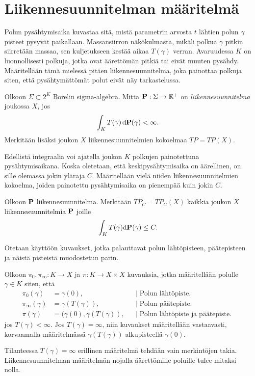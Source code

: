 \documentclass[12pt,oneside,a4paper]{amsbook} %
\begin{document}
\section{Liikennesuunnitelman määritelmä}

Polun pysähtymisaika kuvastaa sitä, mistä parametrin arvosta $t$ lähtien polun $\gamma$ pisteet pysyvät paikallaan. Massansiirron näkökulmasta, mikäli polkua $\gamma$ pitkin siirretään massaa, sen kuljetukseen kestää aikaa $T(\gamma)$ verran. Avaruudessa $K$ on luonnollisesti polkuja, jotka ovat äärettömän pitkiä tai eivät muuten pysähdy. Määritellään tämä mielessä pitäen liikennesuunnitelma, joka painottaa polkuja siten, että pysähtymättömät polut eivät näy tarkastelussa.

\begin{definition}\label{def:liikennesuunnitelma}
    Olkoon $\Sigma \subset 2^K$ Borelin sigma-algebra. Mitta $\P: \Sigma \to \R^+$ on \textit{liikennesuunnitelma} joukossa $X$, jos
    \begin{equation*}
     \int_K T(\gamma) \, \d \P (\gamma) < \infty.   
    \end{equation*}
    Merkitään lisäksi joukon $X$ liikennesuunnitelmien kokoelmaa $TP = TP(X)$.
\end{definition}

Edellistä integraalia voi ajatella joukon $K$ polkujen painotettuna pysähtymisaikana. Koska oletetaan, että keskipysähtymisaika on äärellinen, on sille olemassa jokin yläraja $C$. Määritellään vielä niiden liikennesuunnitelmien kokoelma, joiden painotettu pysähtymisaika on pienempää kuin jokin $C$.

\begin{definition}
    Olkoon $\P$ liikennesuunnitelma. Merkitään $TP_C = TP_C(X)$ kaikkia joukon $X$ liikennesuunnitelmia $\P$ joille
    \begin{equation*}
        \int_K T(\gamma) \d \P(\gamma) \le C.
    \end{equation*}
\end{definition}

Otetaan käyttöön kuvaukset, jotka palauttavat polun lähtöpisteen, päätepisteen ja näistä pisteistä muodostetun parin.

\begin{definition}
    Olkoon $\pi_0, \pi_\infty: K\to X$ ja $\pi:K\to X \times X$ kuvauksia, jotka määritellään polulle $\gamma \in K$ siten, että 
    \begin{align*}
        \pi_0(\gamma) &= \gamma(0), &&\Big| \text{ Polun lähtöpiste. }\\
        \pi_\infty(\gamma) &= \gamma(T(\gamma)), &&\Big| \text{ Polun päätepiste. }\\
        \pi(\gamma) &= (\gamma(0), \gamma(T(\gamma)), &&\Big| \text{ Polun lähtöpiste ja päätepiste. }
    \end{align*}
    jos $T(\gamma) < \infty$. Jos $T(\gamma) = \infty$, niin kuvaukset määritellään vastaavasti, korvaamalla määritelmässä $\gamma(T(\gamma))$ alkupisteellä $\gamma(0).$
\end{definition}
Tilanteessa $T(\gamma) = \infty$ erillinen määritelmä tehdään vain merkintöjen takia. Liikennesuunnitelman määritelmän nojalla äärettömille poluille tulee mitaksi nolla.
\end{document}
